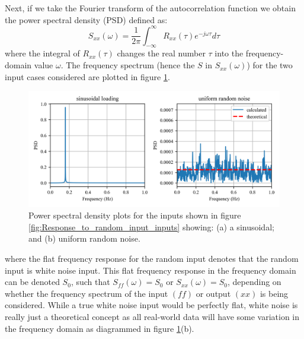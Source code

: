 \documentclass[12pt,letter]{article}
\numberwithin{ex}{section} %
\numberwithin{re}{section} %
\begin{document}
Next, if we take the Fourier transform of the autocorrelation function we obtain the power spectral density (PSD) defined as:
\begin{equation}
S_{xx}(\omega) =\frac{1}{2 \pi} \int_{-\infty}^{\infty} R_{xx}(\tau) e^{-j \omega \tau}d \tau
\end{equation}
where the integral of $R_{xx}(\tau)$ changes the real number $\tau$ into the frequency-domain value $\omega$. The frequency spectrum (hence the $S$ in $S_{xx}(\omega)$) for the two input cases considered are plotted in figure \ref{fig:Response_to_random_input_PSD}.
\begin{figure}[H]
	\centering
	\includegraphics[width=1\textwidth]{../figures/Response_to_random_input_PSD.png}
	\caption{Power spectral density plots for the inputs shown in figure \ref{fig:Response_to_random_input_inputs} showing: (a) a sinusoidal; and (b) uniform random noise.}
	\label{fig:Response_to_random_input_PSD}
\end{figure}
\noindent where the flat frequency response for the random input denotes that the random input is white noise input.  This flat frequency response in the frequency domain can be denoted $S_0$, such that $S_{ff}(\omega) = S_0$ or $S_{xx}(\omega) = S_0$, depending on whether the frequency spectrum of the input $(ff)$ or output  $(xx)$ is being considered. While a true white noise input would be perfectly flat, white noise is really just a theoretical concept as all real-world data will have some variation in the frequency domain as diagrammed in figure \ref{fig:Response_to_random_input_PSD}(b). 
\end{document}

